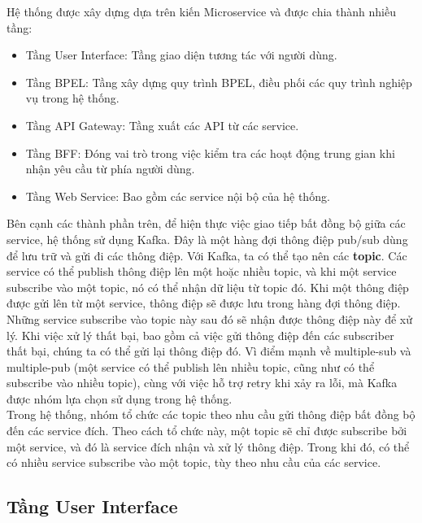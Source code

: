 Hệ thống được xây dựng dựa trên kiến Microservice và được chia thành nhiều tầng:
\begin{itemize}
	\item Tầng User Interface: Tầng giao diện tương tác với người dùng.
	\item Tầng BPEL: Tầng xây dựng quy trình BPEL, điều phối các quy trình nghiệp vụ trong hệ thống.
	\item Tầng API Gateway: Tầng xuất các API từ các service.
	\item Tầng BFF: Đóng vai trò trong việc kiểm tra các hoạt động trung gian khi nhận yêu cầu từ phía người dùng.
	\item Tầng Web Service: Bao gồm các service nội bộ của hệ thống.
\end{itemize}

Bên cạnh các thành phần trên, để hiện thực việc giao tiếp bất đồng bộ giữa các service, hệ thống sử dụng Kafka. Đây là một hàng đợi thông điệp pub/sub dùng để lưu trữ và gửi đi các thông điệp. Với Kafka, ta có thể tạo nên các \textbf{topic}. Các service có thể publish thông điệp lên một hoặc nhiều topic, và khi một service subscribe vào một topic, nó có thể nhận dữ liệu từ topic đó. Khi một thông điệp được gửi lên từ một service, thông điệp sẽ được lưu trong hàng đợi thông điệp. Những service subscribe vào topic này sau đó sẽ nhận được thông điệp này để xử lý. Khi việc xử lý thất bại, bao gồm cả việc gửi thông điệp đến các subscriber thất bại, chúng ta có thể gửi lại thông điệp đó. Vì điểm mạnh về multiple-sub và multiple-pub (một service có thể publish lên nhiều topic, cũng như có thể subscribe vào nhiều topic), cùng với việc hỗ trợ retry khi xảy ra lỗi, mà Kafka được nhóm lựa chọn sử dụng trong hệ thống.\\

Trong hệ thống, nhóm tổ chức các topic theo nhu cầu gửi thông điệp bất đồng bộ đến các service đích. Theo cách tổ chức này, một topic sẽ chỉ được subscribe bởi một service, và đó là service đích nhận và xử lý thông điệp. Trong khi đó, có thể có nhiều service subscribe vào một topic, tùy theo nhu cầu của các service.


\subsection{Tầng User Interface}
